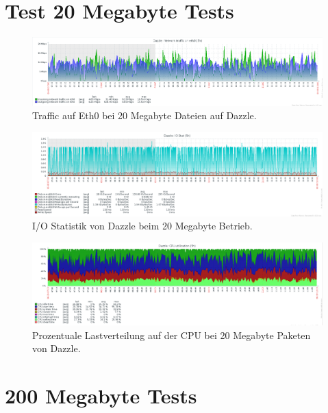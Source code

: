 \section{Test 20 Megabyte Tests}

\begin{figure}[htbp]
\centering
\includegraphics*[width=0.9\linewidth]{Abb/ZabbixDazzle/Standard/Standard20}
\caption{Traffic auf Eth0 bei 20 Megabyte Dateien auf Dazzle.}
\label{fig:Standard20}
\end{figure}


\begin{figure}[htbp]
\centering
\includegraphics*[width=0.9\linewidth]{Abb/ZabbixDazzle/Standard/IoStatStandard20}

\caption{I/O Statistik von Dazzle beim 20 Megabyte Betrieb.}
\label{fig:IoStatStandard20}
\end{figure} %

\begin{figure}[htbp]
\centering
\includegraphics*[width=0.9\linewidth]{Abb/ZabbixDazzle/Standard/CPUStandard20}

\caption{Prozentuale Lastverteilung auf der CPU bei 20 Megabyte Paketen von Dazzle.}
\label{fig:CPUDazzleStandard}
\end{figure}
\FloatBarrier
\newpage
\section{200 Megabyte Tests}


